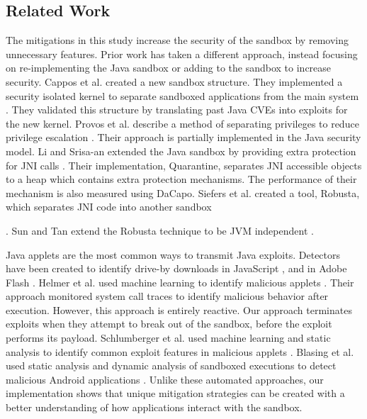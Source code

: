\documentclass{sig-alternate}
\begin{document}
\subsection{Related Work}\label{sub:Related-Work-Mitigation}

The mitigations in this study increase the security of the sandbox
by removing unnecessary features. Prior work has taken a different
approach, instead focusing on re-implementing the Java sandbox or
adding to the sandbox to increase security. Cappos et al. created
a new sandbox structure. They implemented a security isolated kernel
to separate sandboxed applications from the main system \cite{cappos_retaining_2010}.
They validated this structure by translating past Java CVEs into exploits
for the new kernel. Provos et al. describe a method of separating
privileges to reduce privilege escalation \cite{Provos-PrivilegeEscalation}.
Their approach is partially implemented in the Java security model.
Li and Srisa-an extended the Java sandbox by providing extra protection
for JNI calls \cite{li_quarantine:_2011}. Their implementation, Quarantine,
separates JNI accessible objects to a heap which contains extra protection
mechanisms. The performance of their mechanism is also measured using
DaCapo. Siefers et al. created a tool, Robusta, which separates JNI
code into another sandbox \cite{siefers_robusta:_2010}%

. Sun and Tan extend the Robusta technique to be JVM independent \cite{sun_jvm-portable_2012}. 

Java applets are the most common ways to transmit Java exploits. Detectors
have been created to identify drive-by downloads in JavaScript \cite{cova_detection_2010},
and in Adobe Flash \cite{ford_analyzing_2009}. Helmer et al. used
machine learning to identify malicious applets \cite{helmer_anomalous_2001}.
Their approach monitored system call traces to identify malicious
behavior after execution. However, this approach is entirely reactive.
Our approach terminates exploits when they attempt to break out of
the sandbox, before the exploit performs its payload. Schlumberger
et al. used machine learning and static analysis to identify common
exploit features in malicious applets \cite{schlumberger_jarhead_2012}.
Blasing et al. used static analysis and dynamic analysis of sandboxed
executions to detect malicious Android applications \cite{Blasing-AndriodSandbox}.
Unlike these automated approaches, our implementation shows that unique
mitigation strategies can be created with a better understanding of
how applications interact with the sandbox. 
\end{document}
